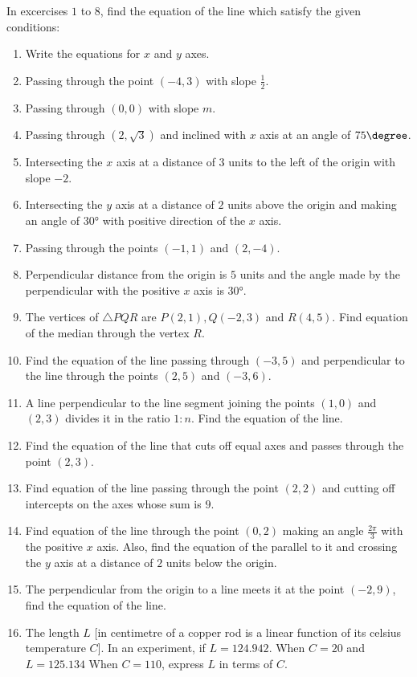  In excercises $1$ to $8$, find the equation of the line which satisfy  the given conditions:
\begin{enumerate}
\item Write the equations for $x$ and $y$ axes.
\item Passing through the point $(-4,3)$ with slope $\frac {1}{2}$.
\item Passing through $(0,0)$ with slope $m$.
\item Passing through $(2,\sqrt {3})$ and inclined with $x$ axis at an angle of $75\degree$.
\item Intersecting the $x$ axis at a distance of $3$ units to the left of the origin with slope $-2$.
\item Intersecting the $y$ axis at a distance of $2$ units above the origin and making an angle of $30°$ with positive direction of the $x$ axis.
\item Passing through the points $(-1,1)$ and $(2,-4)$.
\item Perpendicular distance from the origin is $5$ units and the angle made by the perpendicular with the positive $x$ axis is $30°$. 
\item The vertices of $\triangle PQR$ are $P(2,1), Q(-2,3)$ and $R(4,5)$. Find equation of the median through the vertex $R$.
\item Find the equation of the line passing through $(-3,5)$ and perpendicular to the line through the points $(2,5)$ and $(-3,6)$.
\item A line perpendicular to the line segment joining the points $(1,0)$  and $(2,3)$ divides it in the ratio $1:n$. Find the equation of the line.
\item Find the equation of the line that cuts off equal axes and passes through the point $(2,3)$.
\item Find equation of the line passing through the point $(2,2)$ and cutting off intercepts on the axes whose sum is $9$.
\item Find equation of the line through the point $(0,2)$ making an angle $\frac{2\pi}{3}$ with the positive $x$ axis. Also, find the equation of the parallel to it and crossing the $y$ axis at a distance of $2$ units below the origin.
\item The perpendicular from the origin to a line meets it at the point $(-2,9)$, find the equation of the line.
\item The length $L$ [in centimetre of a copper rod is a linear function of its celsius temperature $C$]. In an experiment, if $L=124.942$. When $C=20$  and $L=125.134$ When $C=110$, express $L$ in terms of $C$.

\end{enumerate}
